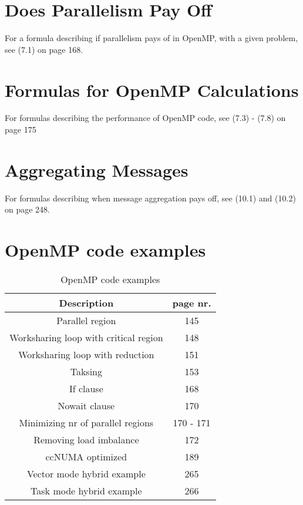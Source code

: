 \documentclass{article}
\begin{document}
	\section{Does Parallelism Pay Off}
		For a formula describing if parallelism pays of in OpenMP, with a given problem, see (7.1) on page 168.
	
	\section{Formulas for OpenMP Calculations}
		For formulas describing the performance of OpenMP code, see (7.3) - (7.8) on page 175
	
	\section{Aggregating Messages}
		For formulas describing when message aggregation pays off, see (10.1) and (10.2) on page 248.

	\section{OpenMP code examples}
		\begin{table}[htbp]
			\centering
			\begin{tabular}{c|c}
				Description & page nr.\\
				\hline
				Parallel region & 145\\
				Worksharing loop with critical region & 148\\
				Worksharing loop with reduction & 151\\
				Taksing & 153\\
				If clause & 168\\
				Nowait clause & 170\\
				Minimizing nr of parallel regions & 170 - 171\\
				Removing load imbalance & 172\\
				ccNUMA optimized & 189\\
				Vector mode hybrid example & 265\\
				Task mode hybrid example & 266
			\end{tabular}
			\caption{OpenMP code examples}
		\end{table}

	\newpage
\end{document}
